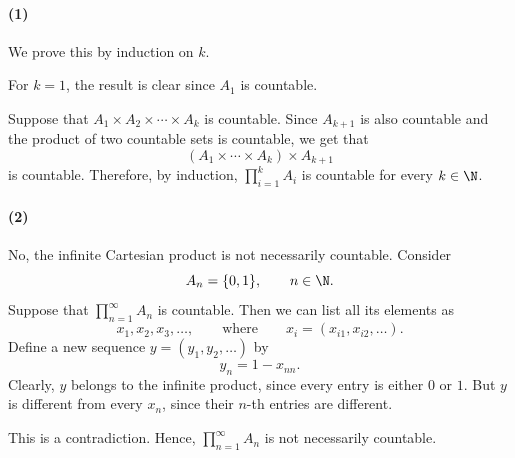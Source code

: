 
\paragraph{(1)}
We prove this by induction on $k$.

For $k=1$, the result is clear since $A_1$ is countable.

Suppose that $A_1\times A_2\times\cdots\times A_k$ is countable. Since $A_{k+1}$ is also
countable and the product of two countable sets is countable, we get that
\[
  (A_1\times\cdots\times A_k)\times A_{k+1}
\]
is countable. Therefore, by induction, $\prod_{i=1}^{k}A_i$ is countable for every
$k\in\N$.

\paragraph{(2)}
No, the infinite Cartesian product is not necessarily countable. Consider
\[
  A_n=\{0,1\},\qquad n\in\N.
\]
Suppose that $\prod_{n=1}^{\infty}A_n$ is countable. Then we can list all its elements as
\[
  x_1,x_2,x_3,\ldots,
  \qquad\text{where}\qquad
  x_i=(x_{i1},x_{i2},\ldots).
\]
Define a new sequence $y=(y_1,y_2,\ldots)$ by
\[
  y_n=1-x_{nn}.
\]
Clearly, $y$ belongs to the infinite product, since every entry is either $0$ or $1$. But $y$
is different from every $x_n$, since their $n$-th entries are different.

This is a contradiction. Hence, $\prod_{n=1}^{\infty}A_n$ is not necessarily countable.
